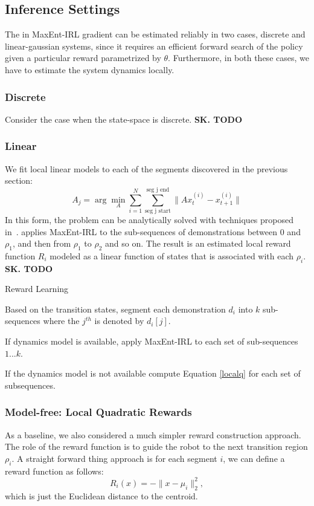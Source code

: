 \subsection{Inference Settings}
The in MaxEnt-IRL gradient can be estimated reliably in two cases, discrete and linear-gaussian systems, since it requires an efficient forward search of the policy given a particular reward parametrized by $\theta$.
Furthermore, in both these cases, we have to estimate the system dynamics locally.

\subsubsection{Discrete}
Consider the case when the state-space is discrete.
\textbf{SK. TODO}



\subsubsection{Linear}
We fit local linear models to each of the segments discovered in the previous section:
\[
A_j = \arg\min_{A} \sum_{i=1}^N \sum_{\text{seg j start}}^{\text{seg j end}} \|A x^{(i)}_{t} - x^{(i)}_{t+1}\|
\]
In this form, the problem can be analytically solved with techniques proposed in~\cite{ziebart2012probabilistic}.
\hirl applies MaxEnt-IRL to the sub-sequences of demonstrations between 0 and $\rho_1$, and then from $\rho_1$ to $\rho_2$ and so on.
The result is an estimated local reward function $R_{i}$ modeled as a linear function of states that is associated with each $\rho_i$.
\textbf{SK. TODO}


\begin{phase}[t]
\small
\DontPrintSemicolon
\caption{Reward Learning \label{alg:tsh2}}

Based on the transition states, segment each demonstration $d_i$ into $k$ sub-sequences where the $j^{th}$ is denoted by $d_i[j]$.

If dynamics model is available, apply MaxEnt-IRL to each set of sub-sequences $1...k$.

If the dynamics model is not available compute Equation \ref{localq} for each set of subsequences.

\end{phase}

\vspace{-15pt}
\subsubsection{Model-free: Local Quadratic Rewards}
As a baseline, we also considered a much simpler reward construction approach.
The role of the reward function is to guide the robot to the next transition region $\rho_i$.
A straight forward thing approach is for each segment $i$, we can define a reward function as follows:
\[
R_i(x) = -\|x - \mu_{i}\|_2^2, 
\]
which is just the Euclidean distance to the centroid.

